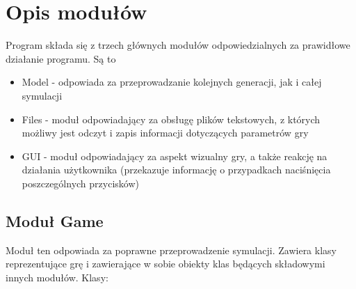 \documentclass[10pt, oneside]{article}
\begin{document}
\section {Opis modułów}
Program składa się z trzech głównych modułów odpowiedzialnych za prawidłowe działanie programu. Są to
\begin {itemize}
\item Model -  odpowiada za przeprowadzanie kolejnych generacji, jak i całej symulacji
\item Files - moduł odpowiadający za obsługę plików tekstowych, z których możliwy jest odczyt i zapis informacji dotyczących parametrów gry
\item GUI - moduł odpowiadający za aspekt wizualny gry, a także reakcję na działania użytkownika (przekazuje informację o przypadkach naciśnięcia poszczególnych przycisków)
\end{itemize}

\subsection {Moduł 	Game}
Moduł ten odpowiada za poprawne przeprowadzenie symulacji. Zawiera klasy reprezentujące grę i zawierające w sobie obiekty klas będących składowymi innych modułów.
Klasy:
\end{document}
